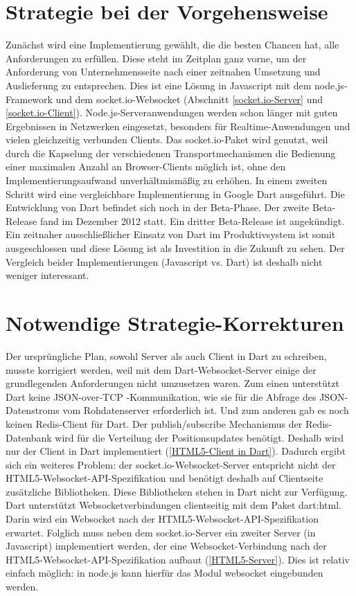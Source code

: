 \section{Strategie bei der Vorgehensweise}\label{Strategie bei der Vorgehensweise}
Zunächst wird eine Implementierung gewählt, die die besten Chancen hat, alle Anforderungen zu erfüllen. Diese steht im Zeitplan ganz vorne, um der Anforderung von Unternehmensseite nach einer zeitnahen Umsetzung und Auslieferung zu entsprechen.
Dies ist eine Lösung in Javascript mit dem node.js-Framework und dem socket.io-Websocket (Abschnitt \ref{socket.io-Server} und \ref{socket.io-Client}). Node.js-Serveranwendungen werden schon länger mit guten Ergebnissen in Netzwerken eingesetzt, besonders für Realtime-Anwendungen und vielen gleichzeitig verbunden Clients. Das socket.io-Paket wird genutzt, weil durch die Kapselung der verschiedenen Transportmechanismen die Bedienung einer maximalen Anzahl an Browser-Clients möglich ist, ohne den Implementierungsaufwand unverhältmismäßig zu erhöhen.
In einem zweiten Schritt wird eine vergleichbare Implementierung in Google Dart ausgeführt. Die Entwicklung von Dart befindet sich noch in der Beta-Phase. Der zweite Beta-Release fand im Dezember 2012 statt. Ein dritter Beta-Release ist angekündigt. Ein zeitnaher ausschließlicher Einsatz von Dart im Produktivsystem ist somit ausgeschlossen und diese Lösung ist als Investition in die Zukunft zu sehen. 
Der Vergleich beider Implementierungen (Javascript vs. Dart) ist deshalb nicht weniger interessant.   
\section{Notwendige Strategie-Korrekturen}
Der ursprüngliche Plan, sowohl Server als auch Client in Dart zu schreiben, musste korrigiert werden, weil mit dem Dart-Websocket-Server einige der grundlegenden Anforderungen nicht umzusetzen waren. Zum einen unterstützt Dart keine JSON-over-TCP -Kommunikation, wie sie für die Abfrage des JSON-Datenstroms vom Rohdatenserver erforderlich ist. Und zum anderen gab es noch keinen Redis-Client für Dart. Der publish/subscribe Mechanismus der Redis-Datenbank wird für die Verteilung der Positionsupdates benötigt.
Deshalb wird nur der Client in Dart implementiert (\ref{HTML5-Client in Dart}). Dadurch ergibt sich ein weiteres Problem: der socket.io-Websocket-Server entspricht nicht der HTML5-Websocket-API-Spezifikation und benötigt deshalb auf Clientseite zusätzliche Bibliotheken. Diese Bibliotheken stehen in Dart nicht zur Verfügung. Dart unterstützt Websocketverbindungen clientseitig mit dem Paket dart:html. Darin wird ein Websocket nach der HTML5-Websocket-API-Spezifikation erwartet.
Folglich muss neben dem socket.io-Server ein zweiter Server (in Javascript) implementiert werden, der eine Websocket-Verbindung nach der HTML5-Websocket-API-Spezifikation aufbaut (\ref{HTML5-Server}). Dies ist relativ einfach  möglich: in node.js kann hierfür das Modul websocket eingebunden werden.

